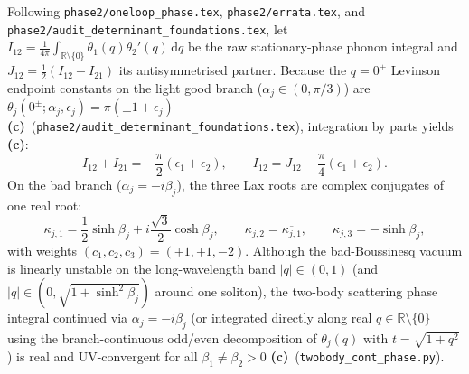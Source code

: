 \documentclass[11pt,a4paper]{article}
\newcommand{\Lc}{\textbf{(c)}}
\newcommand{\script}[1]{\texttt{#1}}
\newcommand{\dd}{\mathrm{d}}
\begin{document}
Following \texttt{phase2/oneloop\_phase.tex}, \texttt{phase2/errata.tex}, and \texttt{phase2/audit\_determinant\_foundations.tex}, let $I_{12}=\frac{1}{4\pi}\int_{\mathbb{R}\setminus\{0\}}\theta_1(q)\theta_2'(q)\,\dd q$ be the raw stationary-phase phonon integral and $J_{12}=\frac12(I_{12}-I_{21})$ its antisymmetrised partner. Because the $q=0^\pm$ Levinson endpoint constants on the light good branch ($\alpha_j\in(0,\pi/3)$) are $\theta_j(0^\pm;\alpha_j,\epsilon_j)=\pi(\pm 1+\epsilon_j)$ \Lc\ (\texttt{phase2/audit\_determinant\_foundations.tex}), integration by parts yields \Lc:
\begin{equation}\label{eq:I_J_relation}
I_{12}+I_{21}=-\frac{\pi}{2}(\epsilon_1+\epsilon_2),\qquad
I_{12}=J_{12}-\frac{\pi}{4}(\epsilon_1+\epsilon_2).
\end{equation}
On the bad branch ($\alpha_j=-i\beta_j$), the three Lax roots are complex conjugates of one real root:
\begin{equation}\label{eq:bad_roots}
\kappa_{j,1}=\frac12\sinh\beta_j+i\frac{\sqrt3}{2}\cosh\beta_j,\qquad
\kappa_{j,2}=\overline{\kappa_{j,1}},\qquad
\kappa_{j,3}=-\sinh\beta_j,
\end{equation}
with weights $(c_1,c_2,c_3)=(+1,+1,-2)$. Although the bad-Boussinesq vacuum is linearly unstable on the long-wavelength band $|q|\in(0,1)$ (and $|q|\in(0,\sqrt{1+\sinh^2\beta_j})$ around one soliton), the two-body scattering phase integral continued via $\alpha_j=-i\beta_j$ (or integrated directly along real $q\in\mathbb{R}\setminus\{0\}$ using the branch-continuous odd/even decomposition of $\theta_j(q)$ with $t=\sqrt{1+q^2}$) is real and UV-convergent for all $\beta_1\neq\beta_2>0$ \Lc\ (\script{twobody\_cont\_phase.py}).
\end{document}
